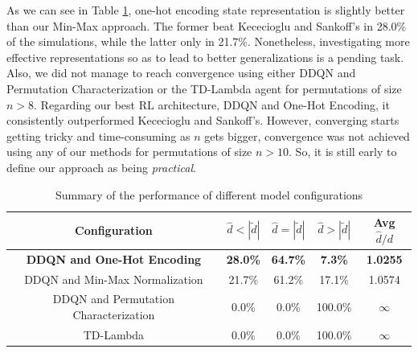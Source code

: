 \documentclass[11pt,twoside]{article}
\begin{document}
As we can see in Table \ref{table:results}, one-hot encoding state representation is slightly better than our Min-Max approach. The former beat Kececioglu and Sankoff's in 28.0\% of the simulations, while the latter only in 21.7\%. Nonetheless, investigating more effective representations so as to lead to better generalizations is a pending task. Also, we did not manage to reach convergence using either DDQN and Permutation Characterization or the TD-Lambda agent for permutations of size $n > 8$. Regarding our best RL architecture, DDQN and One-Hot Encoding, it consistently outperformed Kececioglu and Sankoff's. However, converging starts getting tricky and time-consuming as $n$ gets bigger, convergence was not achieved using any of our methods for permutations of size $n > 10$. So, it is still early to define our approach as being \textit{practical}.

\begin{table}[H]
	\begin{center}
		\begin{tabular}{|c|c|c|c|c|}
			\hline
			Configuration & $\hat{d} < |\widetilde{d}|$ & $\hat{d} = |\widetilde{d}|$ & $\hat{d} > |\widetilde{d}|$ & Avg $\hat{d}/d$\\
			\hline\hline
			\textbf{DDQN and One-Hot Encoding} & \textbf{28.0\%} & \textbf{64.7\%} & \textbf{7.3\%} & \textbf{1.0255}\\
			DDQN and Min-Max Normalization & 21.7\% & 61.2\% & 17.1\% & 1.0574\\
			DDQN and Permutation Characterization & 0.0\% & 0.0\% & 100.0\% & $\infty$\\
			TD-Lambda & 0.0\% & 0.0\% & 100.0\% & $\infty$\\
			\hline
		\end{tabular}
		\caption{Summary of the performance of different model configurations}
	\label{table:results}
	\end{center}
\end{table}
\end{document}
